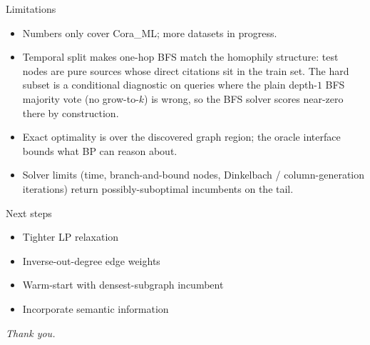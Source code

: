 \documentclass{beamer}
\begin{document}
\begin{frame}{Limitations}
  \begin{itemize}
    \item Numbers only cover Cora\_ML; more datasets in progress.
    \item Temporal split makes one-hop BFS match the homophily structure: test nodes are pure sources whose direct citations sit in the train set. The hard subset is a conditional diagnostic on queries where the plain depth-$1$ BFS majority vote (no grow-to-$k$) is wrong, so the BFS solver scores near-zero there by construction.
    \item Exact optimality is over the discovered graph region; the oracle interface bounds what BP can reason about.
    \item Solver limits (time, branch-and-bound nodes, Dinkelbach / column-generation iterations) return possibly-suboptimal incumbents on the tail.
  \end{itemize}
\end{frame}

\begin{frame}{Next steps}
  \begin{itemize}
    \item Tighter LP relaxation
    \item Inverse-out-degree edge weights
    \item Warm-start with densest-subgraph incumbent
    \item Incorporate semantic information
  \end{itemize}
\end{frame}

\begin{frame}{}
  \centering
  \Large
  \emph{Thank you.}
\end{frame}

\appendix

\end{document}
